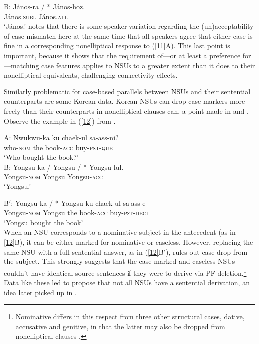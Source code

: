 {B: \gll J\'{a}nos-ra / * J\'{a}nos-hoz.\\
        J\'{a}nos.\textsc{subl} {} {} J\'{a}nos.\textsc{all}\\
\glt  `J\'{a}nos.'\label{11}
\z
%
\citet{Jacobson2016} notes that there is some speaker variation regarding the (un)ac\-cepta\-bi\-li\-ty of case mismatch here at the same time that all speakers agree that either case is fine in a corresponding nonelliptical response to (\ref{11}A). This last point is important, because it shows that the requirement of---or at least a preference for---matching case features applies to NSUs to a greater extent than it does to their nonelliptical equivalents, challenging connectivity effects.

Similarly problematic for case-based parallels between NSUs and their sentential counterparts are some Korean data. Korean NSUs can drop case markers more freely than their counterparts in nonelliptical clauses can, a point made in \citet{Morgan1989} and \citet{Kim2015}. Observe the example in (\ref{12}) from \citet[237]{Morgan1989}.

  \ea
A: \gll Nwukwu-ka        ku  chaek-ul          sa-ass-ni?\\
        who-\textsc{nom} the book-\textsc{acc} buy-\textsc{pst}-\textsc{que}\\
\glt  `Who bought the book?'\\

B: \gll Yongsu-ka / Yongsu / * Yongsu-lul.\\
        Yongsu-\textsc{nom} {} Yongsu {} {} Yongsu-\textsc{acc}\\
\glt  `Yongsu.'

B$'$: \gll Yongsu-ka            /  *  Yongsu ku  chaek-ul          sa-ass-e\\
           Yongsu-\textsc{nom}  {} {} Yongsu the book-\textsc{acc} buy-\textsc{pst}-\textsc{decl}\\
\glt  `Yongsu bought the book'\\
\label{12}
\z
%
When an NSU  corresponds to a nominative subject in the antecedent (as in \ref{12}B), it can be either marked for nominative or caseless.
However, replacing the same NSU  with a full sentential answer, as in (\ref{12}B$'$), rules out case drop from the subject. This strongly suggests that the case-marked and caseless NSUs couldn't have identical source sentences if they were to derive via PF-deletion.\footnote{Nominative differs in this respect from three other structural cases, dative, accusative and genitive, in that the latter may also be dropped from nonelliptical clauses \citep[see][]{Morgan1989, Lee2016, Kim2016}.}  Data like these led \citet{Morgan1989} to propose that not all NSUs have a sentential derivation, an idea later picked up in \citet{Barton1998}.

}
